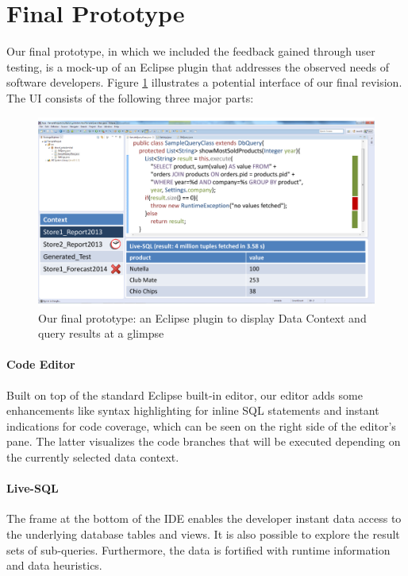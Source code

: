 
\section[Final Prototype (Author: Fabian Tschirschnitz)]{Final Prototype}
\label{sec:FINAL_PROTOTYPE}
Our final prototype, in which we included the feedback gained through user testing, is a mock-up of an Eclipse plugin that addresses the observed needs of software developers. Figure \ref{fig:final_prototype_overview} illustrates a potential interface of our final revision. The UI consists of the following three major parts:

\begin{figure}
\begin{centering}
    \includegraphics[width=1.0\linewidth]{images/final_prototype}
    \caption{Our final prototype: an Eclipse plugin to display Data Context and query results at a glimpse}
    \label{fig:final_prototype_overview}
\end{centering}
\end{figure}

\paragraph{Code Editor} Built on top of the standard Eclipse built-in editor, our editor adds some enhancements like syntax highlighting for inline SQL statements and instant indications for code coverage, which can be seen on the right side of the editor's pane. The latter visualizes the code branches that will be executed depending on the currently selected data context.

\paragraph{Live-SQL} The frame at the bottom of the IDE enables the developer instant data access to the underlying database tables and views. It is also possible to explore the result sets of sub-queries. Furthermore, the data is fortified with runtime information and data heuristics. %


